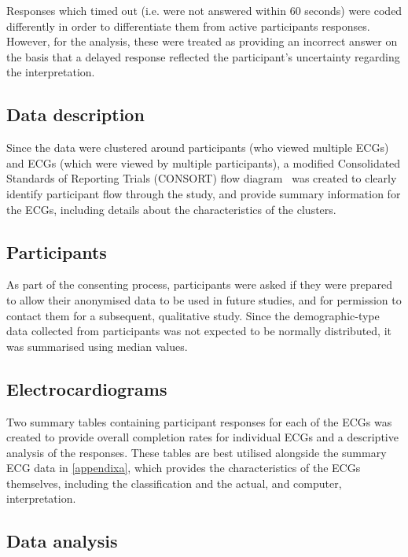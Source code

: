 Responses which timed out (i.e. were not answered within 60 seconds) were coded differently in order to differentiate them from active participants responses. However, for the analysis, these were treated as providing an incorrect answer on the basis that a delayed response reflected the participant's uncertainty regarding the interpretation. 

\subsection{Data description}
\label{datadescription}

Since the data were clustered around participants (who viewed multiple ECGs) and ECGs (which were viewed by multiple participants), a modified Consolidated Standards of Reporting Trials (CONSORT) flow diagram~\citep{campbell_consort_2012} was created to clearly identify participant flow through the study, and provide summary information for the ECGs, including details about the characteristics of the clusters. 

\subsection{Participants}
\label{participants}

As part of the consenting process, participants were asked if they were prepared to allow their anonymised data to be used in future studies, and for permission to contact them for a subsequent, qualitative study. Since the demographic-type data collected from participants was not expected to be normally distributed, it was summarised using median values. 

\subsection{Electrocardiograms}
\label{electrocardiograms}

Two summary tables containing participant responses for each of the ECGs was created to provide overall completion rates for individual ECGs and a descriptive analysis of the responses. These tables are best utilised alongside the summary ECG data in \autoref{appendixa}, which provides the characteristics of the ECGs themselves, including the classification and the actual, and computer, interpretation. 

\subsection{Data analysis}
\label{dataanalysis}

